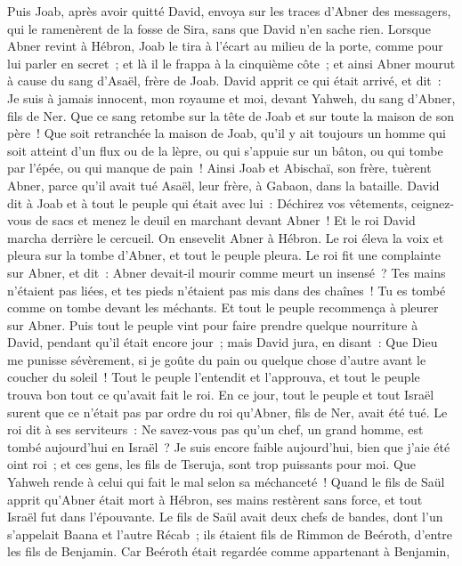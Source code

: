 \begin{multicols}{2}
Puis Joab, après avoir quitté David, envoya sur les traces d'Abner des messagers, qui le ramenèrent de la fosse de Sira, sans que David n'en sache rien.
Lorsque Abner revint à Hébron, Joab le tira à l'écart au milieu de la porte, comme pour lui parler en secret~; et là il le frappa à la cinquième côte~; et ainsi Abner mourut à cause du sang d'Asaël, frère de Joab.
David apprit ce qui était arrivé, et dit~: Je suis à jamais innocent, mon royaume et moi, devant Yahweh, du sang d'Abner, fils de Ner.
Que ce sang retombe sur la tête de Joab et sur toute la maison de son père~! Que soit retranchée la maison de Joab, qu'il y ait toujours un homme qui soit atteint d'un flux ou de la lèpre, ou qui s'appuie sur un bâton, ou qui tombe par l'épée, ou qui manque de pain~!
Ainsi Joab et Abischaï, son frère, tuèrent Abner, parce qu'il avait tué Asaël, leur frère, à Gabaon, dans la bataille.
David dit à Joab et à tout le peuple qui était avec lui~: Déchirez vos vêtements, ceignez-vous de sacs et menez le deuil en marchant devant Abner~! Et le roi David marcha derrière le cercueil.
On ensevelit Abner à Hébron. Le roi éleva la voix et pleura sur la tombe d'Abner, et tout le peuple pleura.
Le roi fit une complainte sur Abner, et dit~: Abner devait-il mourir comme meurt un insensé~?
Tes mains n'étaient pas liées, et tes pieds n'étaient pas mis dans des chaînes~! Tu es tombé comme on tombe devant les méchants. Et tout le peuple recommença à pleurer sur Abner.
Puis tout le peuple vint pour faire prendre quelque nourriture à David, pendant qu'il était encore jour~; mais David jura, en disant~: Que Dieu me punisse sévèrement, si je goûte du pain ou quelque chose d'autre avant le coucher du soleil~!
Tout le peuple l'entendit et l'approuva, et tout le peuple trouva bon tout ce qu'avait fait le roi.
En ce jour, tout le peuple et tout Israël surent que ce n'était pas par ordre du roi qu'Abner, fils de Ner, avait été tué.
Le roi dit à ses serviteurs~: Ne savez-vous pas qu'un chef, un grand homme, est tombé aujourd'hui en Israël~?
Je suis encore faible aujourd'hui, bien que j'aie été oint roi~; et ces gens, les fils de Tseruja, sont trop puissants pour moi. Que Yahweh rende à celui qui fait le mal selon sa méchanceté~!
\VerseOne{}Quand le fils de Saül apprit qu'Abner était mort à Hébron, ses mains restèrent sans force, et tout Israël fut dans l'épouvante.
Le fils de Saül avait deux chefs de bandes, dont l'un s'appelait Baana et l'autre Récab~; ils étaient fils de Rimmon de Beéroth, d'entre les fils de Benjamin. Car Beéroth était regardée comme appartenant à Benjamin,

\end{multicols}
